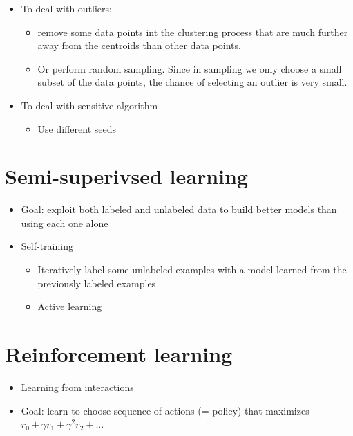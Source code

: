 \documentclass[
]{book}
\providecommand{\tightlist}{%
  \setlength{\itemsep}{0pt}\setlength{\parskip}{0pt}}
\begin{document}
\begin{itemize}
\item
  To deal with outliers:

  \begin{itemize}
  \tightlist
  \item
    remove some data points int the clustering process that are much further away from the centroids than other data points.
  \item
    Or perform random sampling. Since in sampling we only choose a small subset of the data points, the chance of selecting an outlier is very small.
  \end{itemize}
\item
  To deal with sensitive algorithm

  \begin{itemize}
  \tightlist
  \item
    Use different seeds
  \end{itemize}
\end{itemize}

\hypertarget{semi-superivsed-learning}{%
\chapter{Semi-superivsed learning}\label{semi-superivsed-learning}}

\begin{itemize}
\item
  Goal: exploit both labeled and unlabeled data to build better models than using each one alone
\item
  Self-training

  \begin{itemize}
  \tightlist
  \item
    Iteratively label some unlabeled examples with a model learned from the previously labeled examples
  \item
    Active learning
  \end{itemize}
\end{itemize}

\hypertarget{reinforcement-learning}{%
\chapter{Reinforcement learning}\label{reinforcement-learning}}

\begin{itemize}
\tightlist
\item
  Learning from interactions
\item
  Goal: learn to choose sequence of actions (= policy) that maximizes \(r_0 + \gamma r_1 + \gamma^2r_2 + ...\)
\end{itemize}
\end{document}
